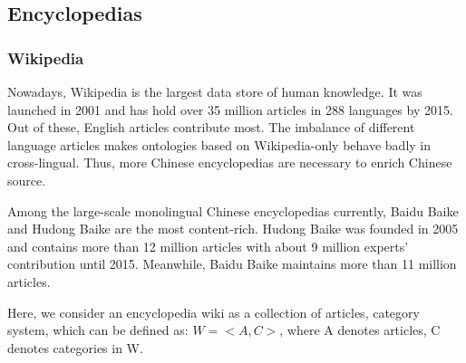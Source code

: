 \documentclass[runningheads,a4paper]{llncs}
\begin{document}
\subsection{Encyclopedias}
\label{sec:encyclopedias}
\subsubsection{Wikipedia}
Nowadays, Wikipedia is the largest data store of human knowledge. It was launched in 2001 and has hold over 35 million articles in 288 languages by 2015. Out of these, English articles contribute most. The imbalance of different language articles makes ontologies based on Wikipedia-only behave badly in cross-lingual. Thus, more Chinese encyclopedias are necessary to enrich Chinese source.

Among the large-scale monolingual Chinese encyclopedias currently, Baidu Baike and Hudong Baike are the most content-rich. Hudong Baike was founded in 2005 and contains more than 12 million articles with about 9 million experts' contribution until 2015. Meanwhile, Baidu Baike maintains more than 11 million articles. 

Here, we consider an encyclopedia wiki as a collection of articles, category system, which can be defined as: $W = <A,C>$, where A denotes articles, C denotes categories in W.
\end{document}
